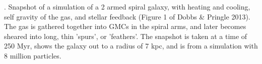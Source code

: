 \textbf{\label{fig:simulation}}. Snapshot of a simulation of a 2 armed spiral galaxy, with heating and cooling, self gravity of the gas, and stellar feedback (Figure 1 of Dobbs & Pringle 2013). The gas is gathered together into GMCs in the spiral arms, and later becomes sheared into long, thin 'spurs', or 'feathers'. The snapshot is taken at a time of 250 Myr, shows the galaxy out to a radius of 7 kpc, and is from a simulation with 8 million particles.